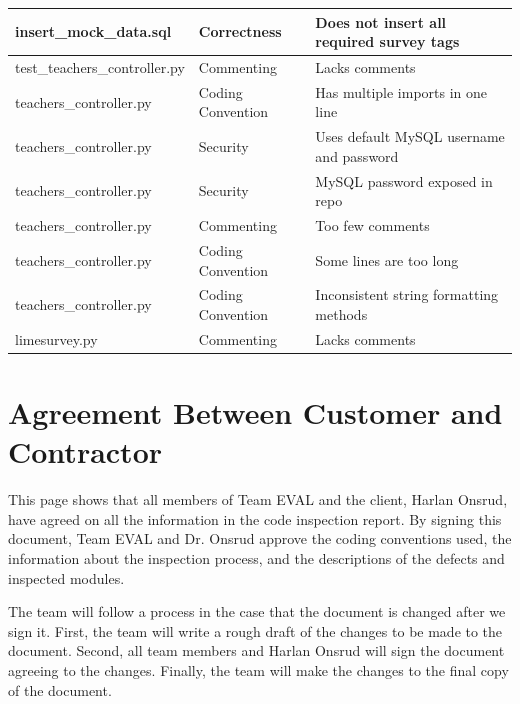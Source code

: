 \documentclass{article}
\begin{document}
\begin{center}
\begin{tabular}{|p{4cm}|p{3cm}|p{6cm}|}
\hline
insert\_mock\_data.sql & Correctness & Does not insert all required survey tags\\ 
\hline
test\_teachers\_controller.py & Commenting & Lacks comments\\ 
\hline
teachers\_controller.py & Coding Convention & Has multiple imports in one line\\ 
\hline
teachers\_controller.py & Security & Uses default MySQL username and \newline password\\ 
\hline
teachers\_controller.py & Security & MySQL password exposed in repo\\ 
\hline
teachers\_controller.py & Commenting & Too few comments\\ 
\hline
teachers\_controller.py & Coding Convention & Some lines are too long\\ 
\hline
teachers\_controller.py & Coding Convention & Inconsistent string formatting methods \\ 
\hline
limesurvey.py & Commenting & Lacks comments \\ 
\hline
\end{tabular}
\end{center}

\appendix

\newpage
\section{Agreement Between Customer and Contractor}
This page shows that all members of Team EVAL and the client, Harlan Onsrud, have agreed on all the information in the code inspection report. By signing this document, Team EVAL and Dr. Onsrud approve the coding conventions used, the information about the inspection process, and the descriptions of the defects and inspected modules.

The team will follow a process in the case that the document is changed after we sign it. First, the team will write a rough draft of the changes to be made to the document. Second, all team members and Harlan Onsrud will sign the document agreeing to the changes. Finally, the team will make the changes to the final copy of the document.
\end{document}

